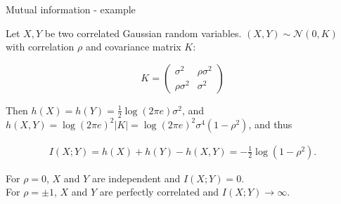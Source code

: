 \begin{vbframe} {Mutual information - example}

Let $X, Y$ be two correlated Gaussian random variables. $(X, Y) \sim \mathcal{N}(0, K)$ with correlation $\rho$ and covariance matrix $K$:

$$
K =
\begin{pmatrix}
  \sigma^2 & \rho \sigma^2 \\
  \rho \sigma^2 & \sigma^2
\end{pmatrix}
$$

Then $h(X) = h(Y) = \frac{1}{2} \log(2 \pi e) \sigma^2$, and $h(X,Y) = \log(2 \pi e)^2 |K| = \log(2 \pi e)^2 \sigma^4 (1 - \rho^2)$, and thus

\begin{equation*}
\begin{aligned}
I(X;Y) = h(X) + h(Y) - h(X,Y) = -  \frac{1}{2} \log(1 - \rho^2).
\end{aligned}
\end{equation*}

For $\rho = 0$, $X$ and $Y$ are independent and $I(X;Y) = 0$. \\
For $\rho = \pm 1$, $X$ and $Y$ are perfectly correlated and $I(X;Y) \rightarrow \infty$. 
\end{vbframe}









